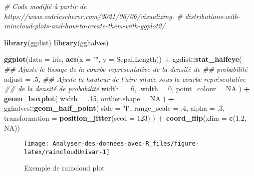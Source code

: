 \documentclass[
  french,
]{book}
\newenvironment{Shaded}{\begin{snugshade}}{\end{snugshade}}
\newcommand{\CommentTok}[1]{\textcolor[rgb]{0.56,0.35,0.01}{\textit{#1}}}
\newcommand{\DataTypeTok}[1]{\textcolor[rgb]{0.13,0.29,0.53}{#1}}
\newcommand{\DecValTok}[1]{\textcolor[rgb]{0.00,0.00,0.81}{#1}}
\newcommand{\FloatTok}[1]{\textcolor[rgb]{0.00,0.00,0.81}{#1}}
\newcommand{\KeywordTok}[1]{\textcolor[rgb]{0.13,0.29,0.53}{\textbf{#1}}}
\newcommand{\NormalTok}[1]{#1}
\newcommand{\OperatorTok}[1]{\textcolor[rgb]{0.81,0.36,0.00}{\textbf{#1}}}
\newcommand{\OtherTok}[1]{\textcolor[rgb]{0.56,0.35,0.01}{#1}}
\newcommand{\StringTok}[1]{\textcolor[rgb]{0.31,0.60,0.02}{#1}}
\begin{document}
\begin{Shaded}
\begin{Highlighting}[]
\CommentTok{# Code modifié à partir de https://www.cedricscherer.com/2021/06/06/visualizing-}
\CommentTok{# distributions-with-raincloud-plots-and-how-to-create-them-with-ggplot2/}

\KeywordTok{library}\NormalTok{(ggdist)}
\KeywordTok{library}\NormalTok{(gghalves)}

\KeywordTok{ggplot}\NormalTok{(}\DataTypeTok{data =}\NormalTok{ iris, }\KeywordTok{aes}\NormalTok{(}\DataTypeTok{x =} \StringTok{""}\NormalTok{, }\DataTypeTok{y =}\NormalTok{ Sepal.Length)) }\OperatorTok{+}\StringTok{ }
\StringTok{  }\NormalTok{ggdist}\OperatorTok{::}\KeywordTok{stat_halfeye}\NormalTok{(}
    \CommentTok{## Ajuste le lissage de la courbe représentative de la densité de }
    \CommentTok{## probabilité}
    \DataTypeTok{adjust =} \FloatTok{.5}\NormalTok{, }
    \CommentTok{## Ajuste la hauteur de l'aire située sous la courbe représentative }
    \CommentTok{## de la densité de probabilité}
    \DataTypeTok{width =} \FloatTok{.6}\NormalTok{, }
    \DataTypeTok{.width =} \DecValTok{0}\NormalTok{, }
    \DataTypeTok{point_colour =} \OtherTok{NA}
\NormalTok{    ) }\OperatorTok{+}\StringTok{ }
\StringTok{  }\KeywordTok{geom_boxplot}\NormalTok{(}
    \DataTypeTok{width =} \FloatTok{.15}\NormalTok{, }
    \DataTypeTok{outlier.shape =} \OtherTok{NA}
\NormalTok{  ) }\OperatorTok{+}
\StringTok{  }\NormalTok{gghalves}\OperatorTok{::}\KeywordTok{geom_half_point}\NormalTok{(}
    \DataTypeTok{side =} \StringTok{"l"}\NormalTok{, }
    \DataTypeTok{range_scale =} \FloatTok{.4}\NormalTok{, }
    \DataTypeTok{alpha =} \FloatTok{.3}\NormalTok{,}
    \DataTypeTok{transformation =} \KeywordTok{position_jitter}\NormalTok{(}\DataTypeTok{seed =} \DecValTok{123}\NormalTok{)}
\NormalTok{  ) }\OperatorTok{+}
\StringTok{  }\KeywordTok{coord_flip}\NormalTok{(}\DataTypeTok{xlim =} \KeywordTok{c}\NormalTok{(}\FloatTok{1.2}\NormalTok{, }\OtherTok{NA}\NormalTok{)) }
\end{Highlighting}
\end{Shaded}

\begin{figure}

{\centering \texttt{[image: Analyser-des-données-avec-R\_files/figure-latex/raincloudUnivar-1]} 

}

\caption{Exemple de raincloud plot}\label{fig:raincloudUnivar}
\end{figure}
\end{document}
